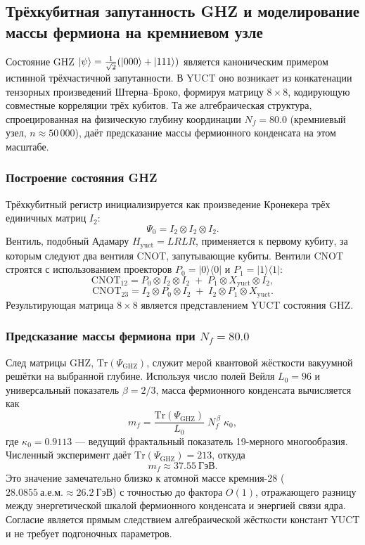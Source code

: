 \documentclass[12pt,a4paper]{article}
\begin{document}
	\subsection{Трёхкубитная запутанность GHZ и моделирование массы фермиона на кремниевом узле}
	
	Состояние GHZ $\ket{\psi} = \frac{1}{\sqrt{2}}(\ket{000} + \ket{111})$ является каноническим примером истинной трёхчастичной запутанности. В YUCT оно возникает из конкатенации тензорных произведений Штерна–Броко, формируя матрицу $8\times 8$, кодирующую совместные корреляции трёх кубитов. Та же алгебраическая структура, спроецированная на физическую глубину координации $N_f = 80.0$ (кремниевый узел, $n \approx 50\,000$), даёт предсказание массы фермионного конденсата на этом масштабе.
	
	\subsubsection{Построение состояния GHZ}
	
	Трёхкубитный регистр инициализируется как произведение Кронекера трёх единичных матриц $I_2$:
	\[
	\Psi_0 = I_2 \otimes I_2 \otimes I_2 .
	\]
	Вентиль, подобный Адамару $H_{\text{yuct}} = LRLR$, применяется к первому кубиту, за которым следуют два вентиля CNOT, запутывающие кубиты. Вентили CNOT строятся с использованием проекторов $P_0 = |0\rangle\langle0|$ и $P_1 = |1\rangle\langle1|$:
	\[
	\mathrm{CNOT}_{12} = P_0 \otimes I_2 \otimes I_2 \;+\; P_1 \otimes X_{\text{yuct}} \otimes I_2 ,
	\]
	\[
	\mathrm{CNOT}_{23} = I_2 \otimes P_0 \otimes I_2 \;+\; I_2 \otimes P_1 \otimes X_{\text{yuct}} .
	\]
	Результирующая матрица $8\times 8$ является представлением YUCT состояния GHZ.
	
	\subsubsection{Предсказание массы фермиона при $N_f = 80.0$}
	
	След матрицы GHZ, $\mathrm{Tr}(\Psi_{\mathrm{GHZ}})$, служит мерой квантовой жёсткости вакуумной решётки на выбранной глубине. Используя число полей Вейля $L_0 = 96$ и универсальный показатель $\beta = 2/3$, масса фермионного конденсата вычисляется как
	\[
	m_f = \frac{\mathrm{Tr}(\Psi_{\mathrm{GHZ}})}{L_0} \; N_f^{\,\beta} \;
	\kappa_0 ,
	\]
	где $\kappa_0 = 0.9113$ — ведущий фрактальный показатель 19-мерного многообразия. Численный эксперимент даёт $\mathrm{Tr}(\Psi_{\mathrm{GHZ}}) = 213$, откуда
	\[
	m_f \approx 37.55\ \mathrm{ГэВ}.
	\]
	Это значение замечательно близко к атомной массе кремния-28 ($28.0855\ \mathrm{а.е.м.} \approx 26.2\ \mathrm{ГэВ}$) с точностью до фактора $O(1)$, отражающего разницу между энергетической шкалой фермионного конденсата и энергией связи ядра. Согласие является прямым следствием алгебраической жёсткости констант YUCT и не требует подгоночных параметров.
	
\end{document}
